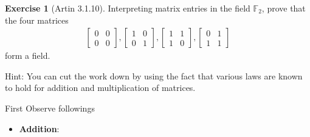 \documentclass[
]{book}
\providecommand{\tightlist}{%
  \setlength{\itemsep}{0pt}\setlength{\parskip}{0pt}}
\theoremstyle{definition}
\theoremstyle{definition}
\theoremstyle{definition}
\newtheorem{exercise}{Exercise}[chapter]
\theoremstyle{definition}
\theoremstyle{remark}
\begin{document}
\begin{exercise}[Artin 3.1.10]
\protect\hypertarget{exr:unnamed-chunk-271}{}\label{exr:unnamed-chunk-271}Interpreting matrix entries in the field \(\mathbb{F}_2\), prove that the four matrices
\begin{align*}
\begin{bmatrix} 0 & 0 \\ 0 & 0 \end{bmatrix}, 
\begin{bmatrix} 1 & 0 \\ 0 & 1 \end{bmatrix}, 
\begin{bmatrix} 1 & 1 \\ 1 & 0 \end{bmatrix}, 
\begin{bmatrix} 0 & 1 \\ 1 & 1 \end{bmatrix}
\end{align*}
form a field.

Hint: You can cut the work down by using the fact that various laws are known to hold for addition and multiplication of matrices.
\end{exercise}

First Observe followings

\begin{itemize}
\tightlist
\item
  \textbf{Addition}:
\end{itemize}
\end{document}
